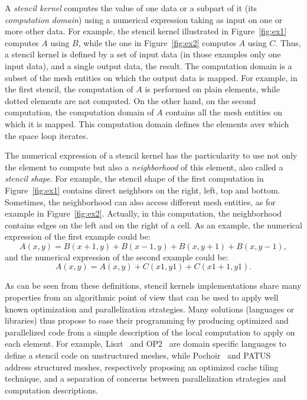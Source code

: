 
A \emph{stencil kernel} computes the value of one data or a subpart of it (its \emph{computation domain}) using a numerical expression taking as input on one or more other data.
For example, the stencil kernel illustrated in Figure~\ref{fig:ex1} computes $A$ using $B$, while the one in Figure~\ref{fig:ex2} computes $A$ using $C$. Thus, a stencil kernel is defined by a set of input data (in those examples only one input data), and a single output data, the result. 
The computation domain is a subset of the mesh entities on which the output data is mapped. For example, in the first stencil, the computation of $A$ is performed on plain elements, while dotted elements are not computed. On the other hand, on the second computation, the computation domain of $A$ contains all the mesh entities on which it is mapped. This computation domain defines the elements aver which the space loop iterates.

The numerical expression of a stencil kernel has the particularity to use not only the element to compute but also a \emph{neighborhood} of this element, also called a \emph{stencil shape}. For example, the stencil shape of the first computation in Figure~\ref{fig:ex1} contains direct neighbors on the right, left, top and bottom. Sometimes, the neighborhood can also access different mesh entities, as for example in Figure~\ref{fig:ex2}. Actually, in this computation, the neighborhood contains edges on the left and on the right of a cell. As an example, the numerical expression of the first example could be:
\begin{equation*} 
A(x,y) = B(x+1,y)+B(x-1,y)+B(x,y+1)+B(x,y-1),
\end{equation*}
and the numerical expression of the second example could be:
\begin{equation*} 
A(x,y) = A(x,y)+C(x1,y1)+C(x1+1,y1).
\end{equation*}

As can be seen from these definitions, stencil kernels implementations share many properties from an algorithmic point of view that can be used to apply well known optimization and parallelization strategies.
Many solutions (languages or libraries) thus propose to ease their programming by producing optimized and parallelized code from a simple description of the local computation to apply on each element.
For example, Liszt~\cite{DeVito2011LDS} and OP2~\cite{Giles2011} are domain specific languages to define a stencil code on unstructured meshes, while Pochoir~\cite{spaaTangCKLL11} and PATUS~\cite{citeulike12258902} address structured meshes, respectively proposing an optimized cache tiling technique, and a separation of concerns between parallelization strategies and computation descriptions.

